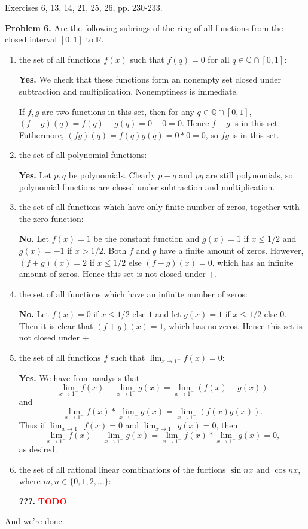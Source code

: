 \documentclass[12pt]{article}
\theoremstyle{remark}
\theoremstyle{named}
\newcommand{\todo}{\textcolor{red}{\textbf{TODO} }}
\begin{document}
Exercises 6, 13, 14, 21, 25, 26, pp. 230-233.

\textbf{Problem 6.} Are the following subrings of the ring of all functions from the closed interval \([0, 1]\) to \(\mathbb R\).
\begin{enumerate}
    \item the set of all functions \(f(x)\) such that \(f(q) = 0\) for all \(q \in \mathbb Q \cap [0, 1]\): 
    
    \textbf{Yes.} We check that these functions form an nonempty set closed under subtraction and multiplication. Nonemptiness is immediate. 

    If \(f, g\) are two functions in this set, then for any \(q \in \mathbb Q \cap [0, 1]\), \((f - g)(q) = f(q) - g(q) = 0 - 0 = 0\). Hence \(f - g\) is in this set. Futhermore, \((fg)(q) = f(q)g(q) = 0 * 0 = 0\), so \(fg\) is in this set. 

    \item the set of all polynomial functions: 
    
    \textbf{Yes.} Let \(p, q\) be polynomials. Clearly \(p - q\) and \(pq\) are still polynomials, so polynomial functions are closed under subtraction and multiplication.
    
    \item the set of all functions which have only finite number of zeros, together with the zero function: 
    
    \textbf{No.} Let \(f(x) = 1\) be the constant function and \(g(x) = 1\) if \(x \le 1/2\) and \(g(x) = -1\) if \(x > 1/2\). Both \(f\) and \(g\) have a finite amount of zeros. However, \((f + g)(x) = 2\) if \(x \le 1/2\) else \((f - g)(x) = 0\), which has an infinite amount of zeros. Hence this set is not closed under \(+\).
    
    \item the set of all functions which have an infinite number of zeros: 
    
    \textbf{No.} Let \(f(x) = 0\) if \(x \le 1/2\) else \(1\) and let \(g(x) = 1\) if \(x \le 1/2\) else \(0\). Then it is clear that \((f + g)(x) = 1\), which has no zeros. Hence this set is not closed under \(+\). 
    
    \item the set of all functions \(f\) such that \(\lim_{x \to 1^-} f(x) = 0\): 
    
    \textbf{Yes.} We have from analysis that 
    \[\lim_{x \to 1^-} f(x) - \lim_{x \to 1^-} g(x) = \lim_{x \to 1^-} (f(x) - g(x))\]
    and 
    \[\lim_{x \to 1^-} f(x) * \lim_{x \to 1^-} g(x) = \lim_{x \to 1^-} (f(x)g(x)).\]
    Thus if \(\lim_{x \to 1^-} f(x) = 0\) and \(\lim_{x \to 1^-} g(x) = 0\), then \[\lim_{x \to 1^-} f(x) - \lim_{x \to 1^-} g(x) = \lim_{x \to 1^-} f(x) * \lim_{x \to 1^-} g(x) = 0,\]
    as desired.
    
    \item the set of all rational linear combinations of the fuctions \(\sin nx\) and \(\cos nx\), where \(m, n \in \{0, 1, 2, \dots\}\): 
    
    \textbf{???.} \todo
    
\end{enumerate}
And we're done.
\newline
\end{document}
